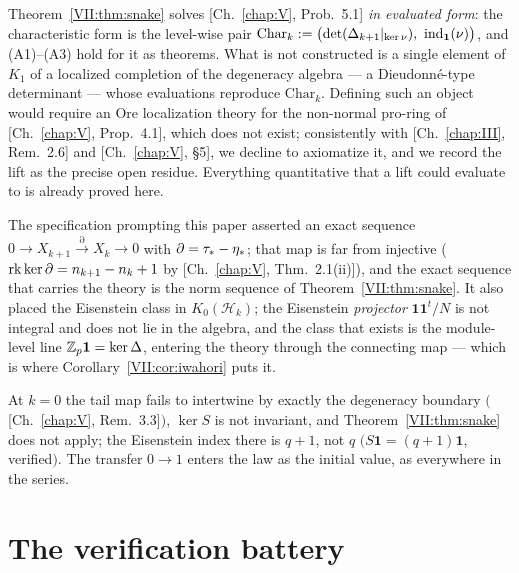 \begin{remark}\label{VII:rem:residue}
Theorem~\ref{VII:thm:snake} solves [Ch.~\ref{chap:V}, Prob.~5.1] \emph{in evaluated form}: the
characteristic form is the level-wise pair
$\mathrm{Char}_k:=\bigl(\det(\Delta_{k+1}|_{\ker\nu}),\ \ind(\nu)\bigr)$, and
(A1)--(A3) hold for it as theorems. What is not constructed is a single element of
$K_1$ of a localized completion of the degeneracy algebra --- a Dieudonn\'e-type
determinant --- whose evaluations reproduce $\mathrm{Char}_k$. Defining such an
object would require an Ore localization theory for the non-normal pro-ring of
[Ch.~\ref{chap:V}, Prop.~4.1], which does not exist; consistently with [Ch.~\ref{chap:III}, Rem.~2.6] and
[Ch.~\ref{chap:V}, \S5], we decline to axiomatize it, and we record the lift as the precise open
residue. Everything quantitative that a lift could evaluate to is already proved
here.
\end{remark}

\begin{remark}\label{VII:rem:corrections}
The specification prompting this paper asserted an exact sequence
$0\to X_{k+1}\xrightarrow{\partial}X_k\to0$ with $\partial=\tau_*-\eta_*$; that map is far
from injective ($\operatorname{rk}\ker\partial=n_{k+1}-n_k+1$ by {\rm[Ch.~\ref{chap:V}, Thm.~2.1(ii)]}), and the
exact sequence that carries the theory is the norm sequence of
Theorem~\ref{VII:thm:snake}. It also placed the Eisenstein class in
$K_0(\mathcal H_k)$; the Eisenstein \emph{projector} $\mathbf1\mathbf1^{t}/N$ is not
integral and does not lie in the algebra, and the class that exists is the
module-level line $\mathbb{Z}_p\mathbf1=\ker\Delta$, entering the theory through the
connecting map --- which is where Corollary~\ref{VII:cor:iwahori} puts it.
\end{remark}

\begin{remark}\label{VII:rem:boundary}
At $k=0$ the tail map fails to intertwine by exactly the degeneracy boundary
$($[Ch.~\ref{chap:V}, Rem.~3.3]$)$, $\ker S$ is not invariant, and Theorem~\ref{VII:thm:snake} does not
apply; the Eisenstein index there is $q+1$, not $q$
$(S\mathbf1=(q+1)\mathbf1$, verified$)$. The transfer $0\to1$ enters the law as the
initial value, as everywhere in the series.
\end{remark}

\section{The verification battery}\label{VII:sec:battery}

